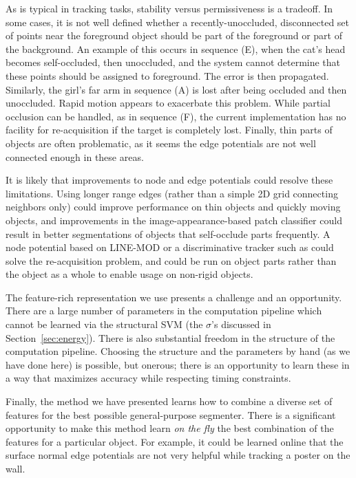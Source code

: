 \documentclass[graybox]{svmult}
\begin{document}
As is typical in tracking tasks, stability versus permissiveness is a tradeoff.  In some cases, it is not well defined whether a recently-unoccluded, disconnected set of points near the foreground object should be part of the foreground or part of the background.  An example of this occurs in sequence (E), when the cat's head becomes self-occluded, then unoccluded, and the system cannot determine that these points should be assigned to foreground.  The error is then propagated.  Similarly, the girl's far arm in sequence (A) is lost after being occluded and then unoccluded.  Rapid motion appears to exacerbate this problem.  While partial occlusion can be handled, as in sequence (F), the current implementation has no facility for re-acquisition if the target is completely lost.  Finally, thin parts of objects are often problematic, as it seems the edge potentials are not well connected enough in these areas.

It is likely that improvements to node and edge potentials could resolve these limitations.  Using longer range edges (rather than a simple 2D grid connecting neighbors only) could improve performance on thin objects and quickly moving objects, and improvements in the image-appearance-based patch classifier could result in better segmentations of objects that self-occlude parts frequently.  A node potential based on LINE-MOD or a discriminative tracker such as \cite{kalal2010a} could solve the re-acquisition problem, and could be run on object parts rather than the object as a whole to enable usage on non-rigid objects.

The feature-rich representation we use presents a challenge and an opportunity.  There are a large number of parameters in the computation pipeline which cannot be learned via the structural SVM (\eg the $\sigma$'s discussed in Section~\ref{sec:energy}). There is also substantial freedom in the structure of the computation pipeline.  Choosing the structure and the parameters by hand (as we have done here) is possible, but onerous; there is an opportunity to learn these in a way that maximizes accuracy while respecting timing constraints.

Finally, the method we have presented learns how to combine a diverse set of features for the best possible general-purpose segmenter.  There is a significant opportunity to make this method learn \emph{on the fly} the best combination of the features for a particular object.  For example, it could be learned online that the surface normal edge potentials are not very helpful while tracking a poster on the wall.
\end{document}
